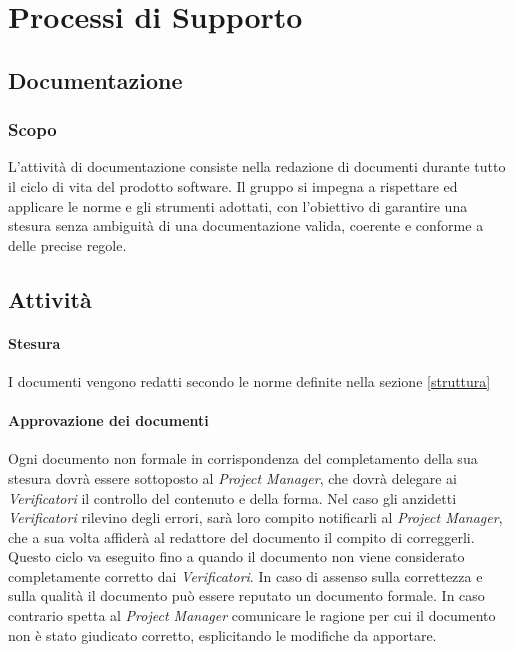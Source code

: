 \section{Processi di Supporto}


\subsection{Documentazione}
\label{sec:documentazione}
\subsubsection{Scopo}
L'attività di documentazione consiste nella redazione di documenti durante tutto il ciclo di vita del prodotto software. Il gruppo si impegna a rispettare ed applicare le norme e gli strumenti adottati, con l'obiettivo di garantire una stesura senza ambiguità di una documentazione valida, coerente e conforme a delle precise regole. 

\subsection{Attività}

\paragraph{Stesura} \Spazio 
I documenti vengono redatti secondo le norme definite nella sezione \ref{struttura} 

\paragraph{Approvazione dei documenti} \Spazio
Ogni documento non formale in corrispondenza del completamento della sua stesura dovrà essere sottoposto al \textit{Project Manager}, che dovrà delegare ai \textit{Verificatori} il controllo del contenuto e della forma. Nel caso gli anzidetti \textit{Verificatori} rilevino degli errori, sarà loro compito notificarli al \textit{Project Manager}, che a sua volta affiderà al redattore del documento il compito di correggerli. Questo ciclo va eseguito fino a quando il documento non viene considerato completamente corretto dai  \textit{Verificatori}. In caso di assenso sulla correttezza e sulla qualità il documento può essere reputato un documento formale. In caso contrario spetta al \textit{Project Manager} comunicare le ragione per cui il documento non è stato giudicato corretto, esplicitando le modifiche da apportare.

